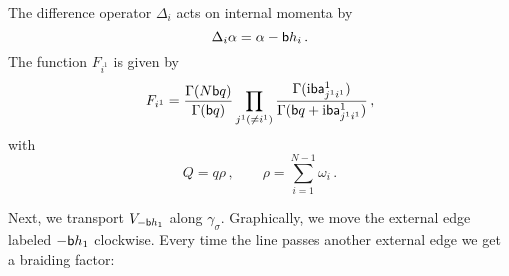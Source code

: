 The difference operator $\Delta_i$ acts on internal momenta by
\begin{equation}
  \Delta_i\alpha = \alpha - \mathsf{b} h_i \,.
\end{equation}
The function $F_{i^1}$ is given by
\begin{equation}
  F_{i^1}
  =
  \frac{\Gamma(N\mathsf{b} q)}{\Gamma(\mathsf{b} q)}
  \prod_{j^1 (\neq i^1)}
  \frac{\Gamma(\mathrm{i}\mathsf{b} \mathsf{a}^1_{j^1i^1})}{\Gamma(\mathsf{b} q + \mathrm{i}\mathsf{b} \mathsf{a}^1_{j^1i^1})}
  \,,
\end{equation}
with
\begin{equation}
  Q = q\rho \,,
  \qquad
  \rho = \sum_{i=1}^{N-1} \omega_i \,.
\end{equation}

Next, we transport $V_{-\mathsf{b} h_1}$ along $\gamma_\sigma$.  Graphically,
we move the external edge labeled $-\mathsf{b} h_1$ clockwise.  Every time
the line passes another external edge we get a braiding factor:
